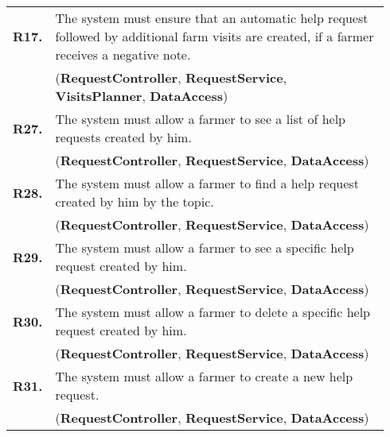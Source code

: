 \begin{longtable}{p{0.06\linewidth} p{0.88\linewidth}}
    \textbf{R17.} & The system must ensure that an automatic help request followed by additional farm visits are created, if a farmer receives a negative note.\\
    & (\textbf{RequestController}, \textbf{RequestService}, \textbf{VisitsPlanner}, \textbf{DataAccess})\\
	
	\textbf{R27.} & The system must allow a farmer to see a list of help requests created by him.\\
	& (\textbf{RequestController}, \textbf{RequestService}, \textbf{DataAccess})\\
	\textbf{R28.} & The system must allow a farmer to find a help request created by him by the topic.\\
	& (\textbf{RequestController}, \textbf{RequestService}, \textbf{DataAccess})\\
	\textbf{R29.} & The system must allow a farmer to see a specific help request created by him.\\
	& (\textbf{RequestController}, \textbf{RequestService}, \textbf{DataAccess})\\
	\textbf{R30.} & The system must allow a farmer to delete a specific help request created by him. \\
	& (\textbf{RequestController}, \textbf{RequestService}, \textbf{DataAccess})\\
	\textbf{R31.} & The system must allow a farmer to create a new help request.\\
	& (\textbf{RequestController}, \textbf{RequestService}, \textbf{DataAccess})\\
	

\end{longtable}
